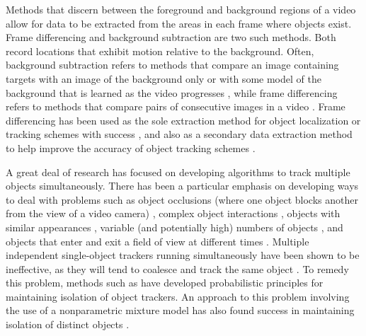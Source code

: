 \documentclass[twocolumn, final]{svjour3}
\begin{document}
Methods that discern between the foreground and background regions of a video allow for data to be extracted from the areas in each frame where objects exist. Frame differencing and background subtraction are two such methods. Both record locations that exhibit motion relative to the background. Often, background subtraction refers to methods that compare an image containing targets with an image of the background only or with some model of the background that is learned as the video progresses \cite{piccardi2004background}, while frame differencing refers to methods that compare pairs of consecutive images in a video \cite{zhang2001segmentation}. Frame differencing has been used as the sole extraction method for object localization or tracking schemes with success \citep{pece_2002, beleznai_2006, chu_2007}, and also as a secondary data extraction method to help improve the accuracy of object tracking schemes \citep{perez_2002}.

A great deal of research has focused on developing algorithms to track multiple objects simultaneously. There has been a particular emphasis on developing ways to deal with problems such as object occlusions (where one object blocks another from the view of a video camera) \cite{senior2006appearance, cucchiara2004probabilistic, zhou2003background}, complex object interactions \cite{khan_2004, mckenna2000tracking, dockstader2001multiple}, objects with similar appearances \cite{maccormick1999probabilistic, jepson_2003}, variable (and potentially high) numbers of objects \cite{reilly2010detection}, and objects that enter and exit a field of view at different times \cite{stauffer2003estimating, nedrich2010learning}. Multiple independent single-object trackers running simultaneously have been shown to be ineffective, as they will tend to coalesce and track the same object \cite{khan_2004}. To remedy this problem, methods such as \cite{maccormick1999probabilistic} have developed probabilistic principles for maintaining isolation of object trackers. An approach to this problem involving the use of a nonparametric mixture model has also found success in maintaining isolation of distinct objects \cite{vermaak_2003}.
\end{document}

